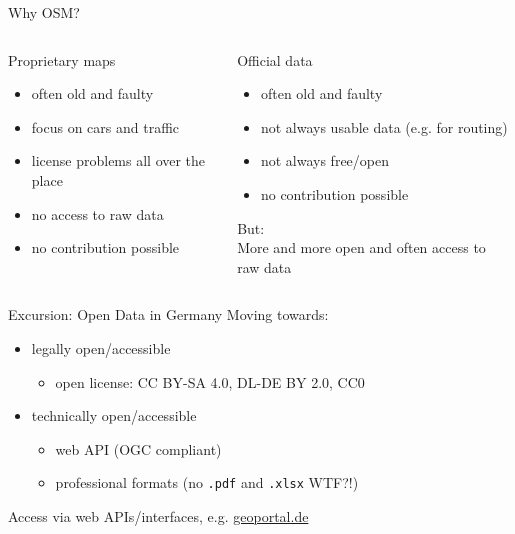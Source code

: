 \documentclass{beamer}
\begin{document}
			\begin{frame}{Why OSM?}
				\begin{columns}[t]
					\begin{column}{0.5\textwidth}
						Proprietary maps
						\begin{itemize}
							\item often old and faulty\pause
							\item focus on cars and traffic\pause
							\item license problems all over the place\pause
							\item no access to raw data
							\item no contribution possible
						\end{itemize}
					\end{column}
					\pause
					\begin{column}{0.5\textwidth}
						Official data
						\begin{itemize}
							\item often old and faulty\pause
							\item not always usable data (e.g. for routing)\pause
							\item not always free/open\pause
							\item no contribution possible
						\end{itemize}
						\pause
						But:\\
						More and more open and often access to raw data
					\end{column}
				\end{columns}
			\end{frame}
			
			\begin{frame}{Excursion: Open Data in Germany}
				Moving towards:
				\begin{itemize}
					\item legally open/accessible
					\begin{itemize}
						\item open license: CC BY-SA 4.0, DL-DE BY 2.0, CC0
					\end{itemize}\pause
					\item technically open/accessible
					\begin{itemize}
						\item web API (OGC compliant)
						\item professional formats (no \texttt{.pdf} and \texttt{.xlsx} WTF?!)
					\end{itemize}
				\end{itemize}
				\pause
				\vspace{0.5cm}
				Access via web APIs/interfaces, e.g. \href{https://www.geoportal.de/}{geoportal.de}
			\end{frame}
			
\end{document}
